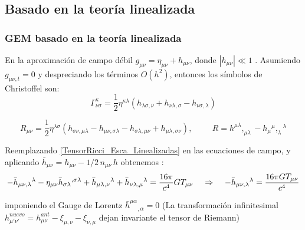 \documentclass[aspectratio=169,10pt,usenames,dvipsnames,spanish]{beamer}
\begin{document}
\subsection{Basado en la teoría linealizada}
\begin{frame}
\frametitle{GEM basado en la teoría linealizada}
En la aproximación de campo débil $g_{\mu \nu}=\eta_{\mu \nu}+h_{\mu \nu}$, donde $|h_{\mu \nu}|\ll1$ \parencite{Bambi2018}. Asumiendo $g_{\mu \nu, t}=0$ y despreciando los términos $O(h^2)$, entonces los símbolos de Christoffel son:
\begin{equation}\label{SimbolosChristoffel}
    \Gamma^\kappa_{\nu \sigma}=\frac{1}{2}\eta^{\kappa\lambda}(h_{\lambda\sigma,\nu}+h_{\nu\lambda,\sigma}-h_{\nu\sigma,\lambda})
\end{equation}

 \begin{equation}\label{TensorRicci_Esca_Linealizadas}
        R_{\mu\nu}=\frac{1}{2}\eta^{\lambda\sigma}(h_{\sigma\nu,\mu\lambda}-h_{\mu\nu,\sigma\lambda}-h_{\sigma\lambda,\mu\nu}+h_{\mu\lambda,\sigma\nu}), \hspace{1cm} R=h^{\mu\lambda},_{\mu\lambda}-h_{\mu}{}^\mu,_\lambda{}^{\lambda}
    \end{equation}
    
Reemplazando \ref{TensorRicci_Esca_Linealizadas} en las ecuaciones de campo, y aplicando $\bar{h}_{\mu\nu}=h_{\mu\nu}-1/2\,n_{\mu\nu}\,h$ obtenemos :
    \begin{equation}\label{EqEinsteinLinealizadash}
        -\bar{h}_{\mu\nu,\lambda}{ }^{\lambda}-\eta_{\mu\nu}\bar{h}_{\sigma\lambda}{}^{,\sigma\lambda}+\bar{h}_{\mu\lambda,\nu}{}^{\lambda}+\bar{h}_{\nu\lambda,\mu}{}^{\lambda}=\frac{16\pi}{c^4}G T_{\mu\nu} \hspace{0.4cm} \Rightarrow \hspace{0.4cm}         -\bar{h}_{\mu\nu,\lambda}{}^{\lambda}=\frac{16 \pi G T_{\mu\nu}}{c^4}
    \end{equation}
    
  imponiendo el Gauge de Lorentz $\bar{h}^{\mu\alpha}{}_{,\alpha}=0$ (La transformación infinitesimal $h_{{\mu'}{\nu'}}^{nuevo}=h_{\mu\nu}^{ant}-\xi_{\mu,\nu}-\xi_{\nu,\mu}$ dejan invariante el tensor de Riemann) \parencite{Misner1973}
\end{frame}

\end{document}
